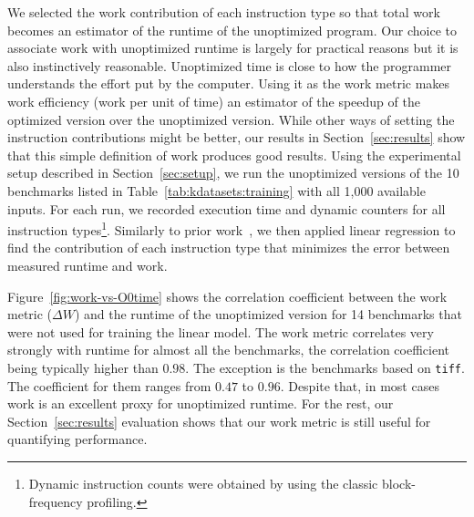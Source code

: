     We selected the work contribution of each instruction type so that total work becomes an estimator of the runtime of the unoptimized
    program.
    Our choice to associate work with unoptimized runtime is largely for practical reasons but it is also instinctively reasonable.
    Unoptimized time is
    close to how the programmer understands the effort put by the computer. Using it as the work metric makes work efficiency (work per unit
    of time) an estimator of the speedup of the optimized version over the unoptimized version. While other ways of setting the instruction
    contributions might be better, our results in Section~\ref{sec:results} show that this simple definition of work produces good results.
    Using the experimental setup described in Section~\ref{sec:setup}, we run the unoptimized versions of the 10 benchmarks listed in
    Table~\ref{tab:kdatasets:training} with all 1,000 available inputs. For each run, we recorded execution time and dynamic counters for all instruction types\footnote{
    Dynamic instruction counts were obtained by using the classic block-frequency profiling.}.
    Similarly to prior work~\cite{giusto01,powell09,brandolese11}, we then applied linear regression to find the contribution of each
    instruction type that minimizes the error between measured runtime and work.

    
    Figure~\ref{fig:work-vs-O0time} shows the correlation coefficient between the work metric ($\Delta W$) and the runtime of the
    unoptimized version for 14 benchmarks that were not used for training the linear model. The work metric correlates very strongly with
    runtime for almost all the benchmarks, the correlation coefficient being typically higher than $0.98$. The exception is the benchmarks
    based on \texttt{tiff}. The coefficient for them ranges from $0.47$ to $0.96$. Despite that, in most cases work is an excellent proxy
    for unoptimized runtime. For the rest, our Section~\ref{sec:results} evaluation shows that our work metric is still useful for quantifying
    performance. 


